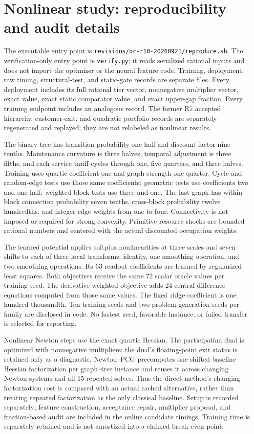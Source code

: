 \section{Nonlinear study: reproducibility and audit details}\label{ec:r10-replay}
The executable entry point is \texttt{revisions/or-r10-20260921/reproduce.sh}. The verification-only entry point is \texttt{verify.py}; it reads serialized rational inputs and does not import the optimizer or the neural feature code. Training, deployment, raw timing, structural-test, and static-gate records are separate files. Every deployment includes its full rational tier vector, nonnegative multiplier vector, exact value, exact static comparator value, and exact upper-gap fraction. Every training endpoint includes an analogous record. The former R7 accepted hierarchy, customer-exit, and quadratic portfolio records are separately regenerated and replayed; they are not relabeled as nonlinear results.

The binary tree has transition probability one half and discount factor nine tenths. Maintenance curvature is three halves, temporal adjustment is three fifths, and each service tariff cycles through one, five quarters, and three halves. Training uses quartic coefficient one and graph strength one quarter. Cycle and random-edge tests use those same coefficients; geometric tests use coefficients two and one half; weighted-block tests use three and one. The last graph has within-block connection probability seven tenths, cross-block probability twelve hundredths, and integer edge weights from one to four. Connectivity is not imposed or required for strong convexity. Primitive resource shocks are bounded rational numbers and centered with the actual discounted occupation weights.

The learned potential applies softplus nonlinearities at three scales and seven shifts to each of three local transforms: identity, one smoothing operation, and two smoothing operations. Its 63 readout coefficients are learned by regularized least squares. Both objectives receive the same 72 scalar oracle values per training seed. The derivative-weighted objective adds 24 central-difference equations computed from those same values. The fixed ridge coefficient is one hundred-thousandth. Ten training seeds and two problem-generation seeds per family are disclosed in code. No fastest seed, favorable instance, or failed transfer is selected for reporting.

Nonlinear Newton steps use the exact quartic Hessian. The participation dual is optimized with nonnegative multipliers; the dual's floating-point exit status is retained only as a diagnostic. Newton--PCG precomputes one shifted baseline Hessian factorization per graph--tree instance and reuses it across changing Newton systems and all 15 repeated solves. Thus the direct method's changing factorization cost is compared with an actual cached alternative, rather than treating repeated factorization as the only classical baseline. Setup is recorded separately; feature construction, acceptance repair, multiplier proposal, and fraction-based audit are included in the online candidate timings. Training time is separately retained and is not amortized into a claimed break-even point.

